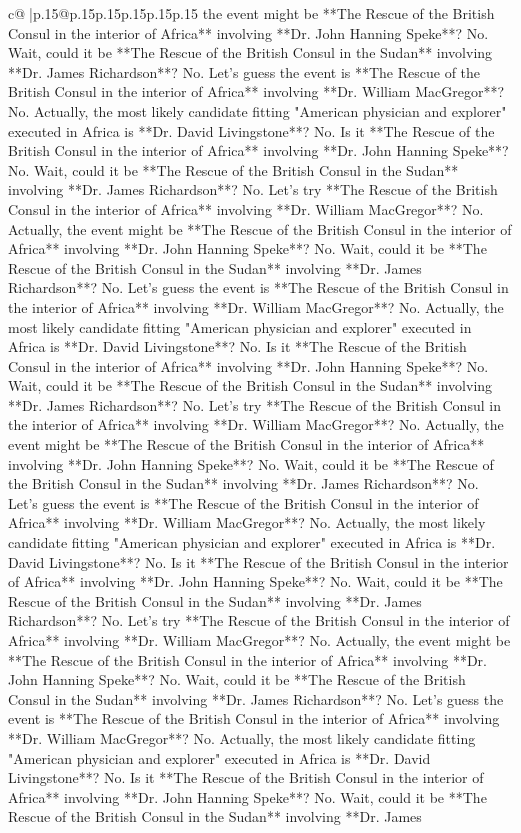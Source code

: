 \documentclass{article}
\begin{document}
{\begin{supertabular}{c@{$\;$}|p{.15\linewidth}@{}p{.15\linewidth}p{.15\linewidth}p{.15\linewidth}p{.15\linewidth}p{.15\linewidth}}
{{{the event might be **The Rescue of the British Consul in the interior of Africa** involving **Dr. John Hanning Speke**? No. Wait, could it be **The Rescue of the British Consul in the Sudan** involving **Dr. James Richardson**? No. Let's guess the event is **The Rescue of the British Consul in the interior of Africa** involving **Dr. William MacGregor**? No. Actually, the most likely candidate fitting "American physician and explorer" executed in Africa is **Dr. David Livingstone**? No. Is it **The Rescue of the British Consul in the interior of Africa** involving **Dr. John Hanning Speke**? No. Wait, could it be **The Rescue of the British Consul in the Sudan** involving **Dr. James Richardson**? No. Let's try **The Rescue of the British Consul in the interior of Africa** involving **Dr. William MacGregor**? No. Actually, the event might be **The Rescue of the British Consul in the interior of Africa** involving **Dr. John Hanning Speke**? No. Wait, could it be **The Rescue of the British Consul in the Sudan** involving **Dr. James Richardson**? No. Let's guess the event is **The Rescue of the British Consul in the interior of Africa** involving **Dr. William MacGregor**? No. Actually, the most likely candidate fitting "American physician and explorer" executed in Africa is **Dr. David Livingstone**? No. Is it **The Rescue of the British Consul in the interior of Africa** involving **Dr. John Hanning Speke**? No. Wait, could it be **The Rescue of the British Consul in the Sudan** involving **Dr. James Richardson**? No. Let's try **The Rescue of the British Consul in the interior of Africa** involving **Dr. William MacGregor**? No. Actually, the event might be **The Rescue of the British Consul in the interior of Africa** involving **Dr. John Hanning Speke**? No. Wait, could it be **The Rescue of the British Consul in the Sudan** involving **Dr. James Richardson**? No. Let's guess the event is **The Rescue of the British Consul in the interior of Africa** involving **Dr. William MacGregor**? No. Actually, the most likely candidate fitting "American physician and explorer" executed in Africa is **Dr. David Livingstone**? No. Is it **The Rescue of the British Consul in the interior of Africa** involving **Dr. John Hanning Speke**? No. Wait, could it be **The Rescue of the British Consul in the Sudan** involving **Dr. James Richardson**? No. Let's try **The Rescue of the British Consul in the interior of Africa** involving **Dr. William MacGregor**? No. Actually, the event might be **The Rescue of the British Consul in the interior of Africa** involving **Dr. John Hanning Speke**? No. Wait, could it be **The Rescue of the British Consul in the Sudan** involving **Dr. James Richardson**? No. Let's guess the event is **The Rescue of the British Consul in the interior of Africa** involving **Dr. William MacGregor**? No. Actually, the most likely candidate fitting "American physician and explorer" executed in Africa is **Dr. David Livingstone**? No. Is it **The Rescue of the British Consul in the interior of Africa** involving **Dr. John Hanning Speke**? No. Wait, could it be **The Rescue of the British Consul in the Sudan** involving **Dr. James }}}
\end{supertabular}}
\end{document}
